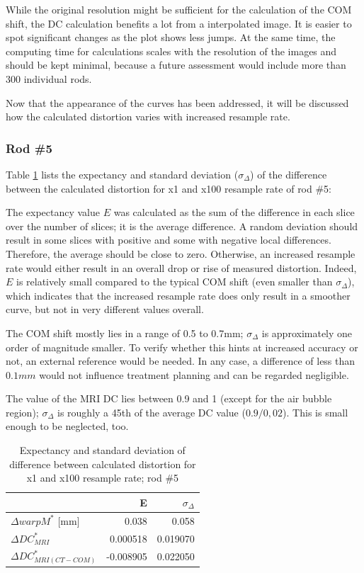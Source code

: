 While the original resolution might be sufficient for the calculation of the COM shift, the DC calculation benefits a lot from a interpolated image.
It is easier to spot significant changes as the plot shows less jumps.
At the same time, the computing time for calculations scales with the resolution of the images and should be kept minimal, because a future assessment would include more than 300 individual rods.

Now that the appearance of the curves has been addressed, it will be discussed how the calculated distortion varies with increased resample rate.

\subsubsection{Rod \#5}

Table \ref{tab:Delta-resample_5} lists the expectancy and standard deviation ($\sigma_\Delta$) of the difference between the calculated distortion for x1 and x100 resample rate of rod \#5:

The expectancy value $E$ was calculated as the sum of the difference in each slice over the number of slices; it is the average difference.
A random deviation should result in some slices with positive and some with negative local differences.
Therefore, the average should be close to zero.
Otherwise, an increased resample rate would either result in an overall drop or rise of measured distortion.
Indeed, $E$ is relatively small compared to the typical COM shift (even smaller than $\sigma_\Delta$), which indicates that the increased resample rate does only result in a smoother curve, but not in very different values overall.

The COM shift mostly lies in a range of 0.5 to 0.7mm; $\sigma_\Delta$ is approximately one order of magnitude smaller.
To verify whether this hints at increased accuracy or not, an external reference would be needed.
In any case, a difference of less than $0.1mm$ would not influence treatment planning and can be regarded negligible.

The value of the MRI DC lies between 0.9 and 1 (except for the air bubble region); $\sigma_\Delta$ is roughly a 45th of the average DC value ($0.9/0,02$). This is small enough to be neglected, too.

\begin{table}[!tbh]
 \centering
\begin{tabular}{l|rr}
                    & E         & $\sigma_\Delta$   \\ \hline
$\Delta warpM^*$ [mm]  & 0.038     & 0.058    \\
$\Delta DC^*_{MRI}$         & 0.000518  & 0.019070 \\
$\Delta DC^*_{MRI(CT-COM)}$ & -0.008905 & 0.022050
\end{tabular}
\caption{Expectancy and standard deviation of difference between calculated distortion for x1 and x100 resample rate; rod \#5}
\label{tab:Delta-resample_5}
\end{table}

